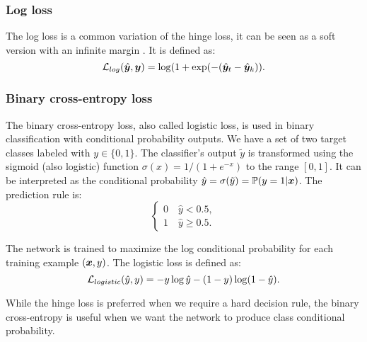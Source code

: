 \subsubsection{Log loss}
The log loss is a common variation of the hinge loss, it can be seen
as a soft version with an infinite margin \cite{lecun2006tutorial}. It
is defined as:
\begin{equation*}
  \mathcal{L}_{log}(\hat{\bm{y}}, \bm{y}) =
  \log(1+\exp(-(\hat{\bm{y}}_t-\hat{\bm{y}}_k)). 
\end{equation*}

\subsubsection{Binary cross-entropy loss}
The binary cross-entropy loss, also called logistic loss, is used in
binary classification with conditional probability outputs. We have a
set of two target classes labeled with $y\in\{0,1\}$. The classifier's
output $\tilde{y}$ is transformed using the sigmoid (also logistic)
function $\sigma(x)=1/(1+e^{-x})$ to the range $[0,1]$. It can be
interpreted as the conditional probability
$\hat{y}=\sigma(\tilde{y})=\mathbb{P}(y=1|\bm{x})$. The prediction rule is:
\begin{equation*}
  \begin{cases}
    0\quad\hat{y}<0.5,\\
    1\quad\hat{y}\geq 0.5.
  \end{cases}
\end{equation*}

The network is trained to maximize the log conditional probability for
each training example $(\bm{x},y)$. The logistic loss is defined as:
\begin{equation*}
  \mathcal{L}_{logistic}(\hat{y},y)=-y\log\hat{y}-(1-y)\log(1-\hat{y}).
\end{equation*}

While the hinge loss is preferred when we require a hard decision
rule, the binary cross-entropy is useful when we want the network to
produce class conditional probability.

